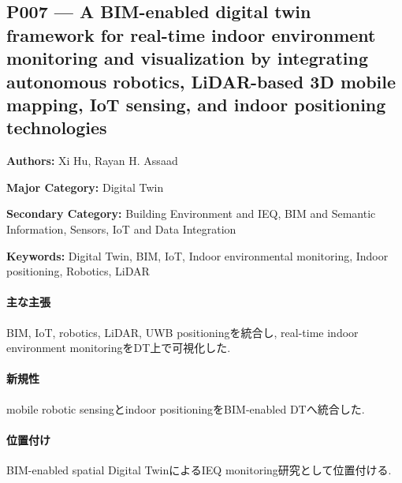 \subsection{P007 --- A BIM-enabled digital twin framework for real-time indoor environment monitoring and visualization by integrating autonomous robotics, LiDAR-based 3D mobile mapping, IoT sensing, and indoor positioning technologies}
\label{paper:P007}
\textbf{Authors:} Xi Hu, Rayan H. Assaad\par
\textbf{Major Category:} Digital Twin\par
\textbf{Secondary Category:} Building Environment and IEQ, BIM and Semantic Information, Sensors, IoT and Data Integration\par
\textbf{Keywords:} Digital Twin, BIM, IoT, Indoor environmental monitoring, Indoor positioning, Robotics, LiDAR\par
\paragraph{主な主張}
BIM, IoT, robotics, LiDAR, UWB positioningを統合し, real-time indoor environment monitoringをDT上で可視化した. \cite{Hu:2024BIMDigitalTwin}
\paragraph{新規性}
mobile robotic sensingとindoor positioningをBIM-enabled DTへ統合した.
\paragraph{位置付け}
BIM-enabled spatial Digital TwinによるIEQ monitoring研究として位置付ける.
